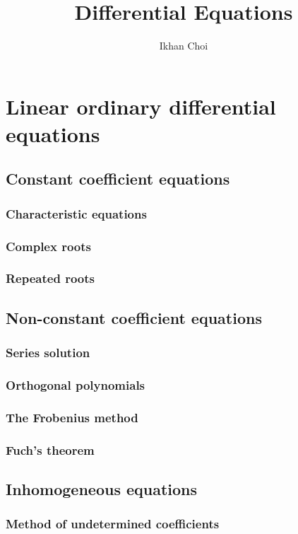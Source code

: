 \documentclass{../note}
\begin{document}
\title{Differential Equations}
\author{Ikhan Choi}
\maketitle
\tableofcontents

\part{Linear ordinary differential equations}
\chapter{Constant coefficient equations}
\section{Characteristic equations}
\section{Complex roots}
\section{Repeated roots}

\chapter{Non-constant coefficient equations}
\section{Series solution}
\section{Orthogonal polynomials}
\section{The Frobenius method}
\section{Fuch's theorem}

\chapter{Inhomogeneous equations}
\section{Method of undetermined coefficients}
\end{document}
